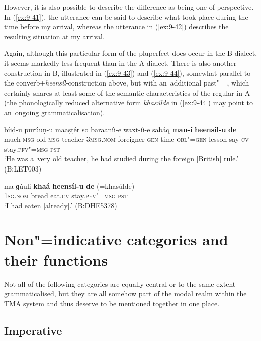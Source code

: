 However, it is also possible to describe the difference as being one of perspective. In (\ref{ex:9-41}), the utterance can be said to describe what took place during the time before my arrival, whereas the utterance in (\ref{ex:9-42}) describes the resulting situation at my arrival.


Again, although this particular form of the pluperfect does occur in the B dialect, it seems markedly less frequent than in the A dialect. There is also another construction in B, illustrated in (\ref{ex:9-43}) and (\ref{ex:9-44}), somewhat parallel to the converb+\textit{heensíl}-construction above, but with an~additional past"= , which certainly shares at least some of the semantic characteristics of the regular  in A (the phonologically reduced alternative form \textit{khasúlde} in (\ref{ex:9-44}) may point to an~ongoing grammaticalisation).

\begin{exe}
\ex
\label{ex:9-43}
\gll bíiḍ-u purúuṇ-u maaṣṭér so baraaníi-e waxt-íi-e sabáq \textbf{man-í} \textbf{heensíl-u} \textbf{de} \\
much-\textsc{msg} old-\textsc{msg} teacher 3\textsc{msg.nom}  foreigner-\textsc{gen}
time-\textsc{obl"=gen} lesson say-\textsc{cv} stay.\textsc{pfv"=msg} \textsc{pst} \\
\glt `He was a~very old teacher, he had studied during the foreign [British] rule.' (B:LET003)

\ex
\label{ex:9-44}
\gll ma ɡúuli \textbf{khaá} \textbf{heensíl-u} \textbf{de} (=khasúlde) \\
\textsc{1sg.nom} bread eat.\textsc{cv} stay.\textsc{pfv"=msg} \textsc{pst}  \\
\glt `I had eaten [already].' (B:DHE5378)
\end{exe}

\section{Non"=indicative  categories and their functions}
\label{sec:9-2}


Not all of the following categories are equally central or to the same extent grammaticalised, but they are all somehow part of the modal realm within the TMA system and thus deserve to be mentioned together in one place.


\subsection{Imperative}
\label{subsec:9-2-1}

